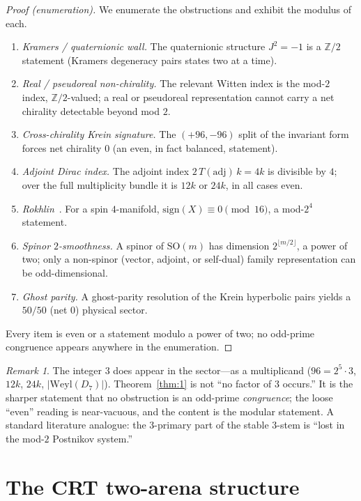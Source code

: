 \documentclass[11pt]{article}
\theoremstyle{definition}
\theoremstyle{remark}
\newtheorem*{remark}{Remark}
\newcommand{\Z}{\mathbb{Z}}
\newcommand{\SO}{\mathrm{SO}}
\begin{document}
\begin{proof}[Proof (enumeration)]
We enumerate the obstructions and exhibit the modulus of each.
\begin{enumerate}[label=(\arabic*),leftmargin=2.2em]
\item \emph{Kramers / quaternionic wall.} The quaternionic structure $J^2=-1$ is a $\Z/2$ statement (Kramers
degeneracy pairs states two at a time).
\item \emph{Real / pseudoreal non-chirality.} The relevant Witten index is the mod-$2$ index, $\Z/2$-valued; a
real or pseudoreal representation cannot carry a net chirality detectable beyond mod $2$.
\item \emph{Cross-chirality Krein signature.} The $(+96,-96)$ split of the invariant form forces net chirality
$0$ (an even, in fact balanced, statement).
\item \emph{Adjoint Dirac index.} The adjoint index $2\,T(\mathrm{adj})\,k = 4k$ is divisible by $4$; over the
full multiplicity bundle it is $12k$ or $24k$, in all cases even.
\item \emph{Rokhlin}~\cite{rokhlin1952}. For a spin $4$-manifold, $\mathrm{sign}(X)\equiv 0 \pmod{16}$, a
mod-$2^4$ statement.
\item \emph{Spinor $2$-smoothness.} A spinor of $\SO(m)$ has dimension $2^{\lfloor m/2\rfloor}$, a power of two;
only a non-spinor (vector, adjoint, or self-dual) family representation can be odd-dimensional.
\item \emph{Ghost parity.} A ghost-parity resolution of the Krein hyperbolic pairs yields a $50/50$ (net $0$)
physical sector.
\end{enumerate}
Every item is even or a statement modulo a power of two; no odd-prime congruence appears anywhere in the
enumeration.
\end{proof}

\begin{remark}
The integer $3$ does appear in the sector---as a multiplicand ($96 = 2^5\cdot 3$, $12k$, $24k$,
$|\mathrm{Weyl}(D_7)|$). Theorem~\ref{thm:1} is not ``no factor of $3$ occurs.'' It is the sharper statement that
no obstruction is an odd-prime \emph{congruence}; the loose ``even'' reading is near-vacuous, and the content is
the modular statement. A standard literature analogue: the $3$-primary part of the stable $3$-stem is ``lost in
the mod-$2$ Postnikov system.''
\end{remark}

\section{The CRT two-arena structure}\label{sec:crt}
\end{document}
